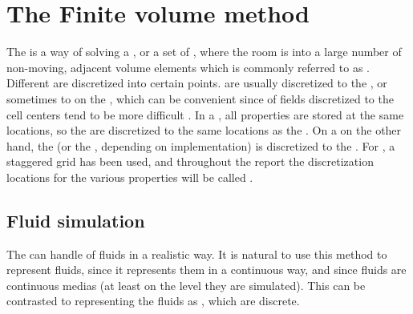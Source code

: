 \chapter{The Finite volume method}
\label{chap:thefinitevolumemethod}



The \FVM is a way of solving a \PDE, or a set of \PDEs, where the room is \discretized into a large number of non-moving, adjacent volume elements which is commonly referred to as \cells. Different \properties are discretized into certain points.  are usually discretized to the , or sometimes to  on the , which can be convenient since \interpolation of fields discretized to the cell centers tend to be more difficult \citep{Losasso2004}. In a , all properties are stored at the same locations, so the  are discretized to the same locations as the . On a  on the other hand, the \velocity (or the \momentum, depending on implementation) is discretized to the . For \thisprojectwork, a staggered grid has been used, and throughout the report the discretization locations for the various properties will be called .

\section{Fluid simulation}

The \FVM can handle \simulation of fluids in a realistic way. It is natural to use this method to represent fluids, since it represents them in a continuous way, and since fluids are continuous medias (at least on the level they are simulated). This can be contrasted to representing the fluids as , which are discrete.

